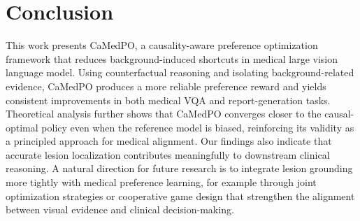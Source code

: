 \section{Conclusion}
\label{sec:con}

This work presents CaMedPO, a causality-aware preference optimization framework that reduces background-induced shortcuts in medical large vision language model. Using counterfactual reasoning and isolating background-related evidence, CaMedPO produces a more reliable preference reward and yields consistent improvements in both medical VQA and report-generation tasks. Theoretical analysis further shows that CaMedPO converges closer to the causal-optimal policy even when the reference model is biased, reinforcing its validity as a principled approach for medical alignment. Our findings also indicate that accurate lesion localization contributes meaningfully to downstream clinical reasoning. A natural direction for future research is to integrate lesion grounding more tightly with medical preference learning, for example through joint optimization strategies or cooperative game design that strengthen the alignment between visual evidence and clinical decision-making.